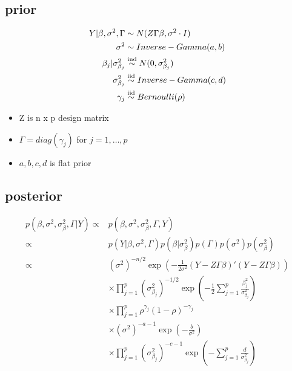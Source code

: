 \documentclass[11pt]{article}
\begin{document}
\subsection{prior}
\begin{align*}
Y | \beta,\sigma^2,\Gamma &\sim N(Z\Gamma\beta, \sigma^2 \cdot I)\\
\sigma^2 &\sim Inverse-Gamma(a,b)\\
\beta_j | \sigma_{\beta_j}^2 &\stackrel{\rm ind}{\sim} N(0,\sigma_{\beta_j}^2)\\
\sigma_{\beta_j}^2 &\stackrel{\rm iid}{\sim} Inverse-Gamma(c,d)\\
\gamma_j &\stackrel{\rm iid}{\sim} Bernoulli(\rho)
\end{align*}
\begin{itemize}
	\item Z is n x p design matrix
	\item $\Gamma = diag({\gamma_j})$ for $j=1,\dots,p$
	\item $a,b,c,d$ is flat prior
\end{itemize}
\subsection{posterior}
\begin{align*}
p(\beta,\sigma^2,\sigma_\beta^2,\Gamma | Y) \propto& p(\beta,\sigma^2,\sigma_\beta^2,\Gamma , Y)\\
\propto& p(Y | \beta,\sigma^2,\Gamma) p(\beta | \sigma_\beta^2)p(\Gamma)p(\sigma^2)p(\sigma_\beta^2)\\
\propto& \left(\sigma^2\right)^{-n/2}\exp\left(-\frac{1}{2\sigma^2}\left(Y - Z\Gamma \beta\right)'\left(Y - Z\Gamma \beta\right)\right)\\
&\times\prod_{j=1}^{p}\left(\sigma_{\beta_j}^2\right)^{-1/2}  \exp\left(-\frac{1}{2}\sum_{j=1}^{p}\frac{\beta_j^2}{\sigma_{\beta_j}^2}\right)\\
&\times\prod_{j=1}^{p} \rho^{\gamma_j}\left(1-\rho\right)^{-\gamma_j}\\
&\times\left(\sigma^2\right)^{-a-1}\exp\left(-\frac{b}{\sigma^2}\right)\\
&\times\prod_{j=1}^{p} \left(\sigma_{\beta_j}^2\right)^{-c-1}\exp\left(-\sum_{j=1}^{p}\frac{d}{\sigma_{\beta_j}^2}\right)
\end{align*}
\end{document}
